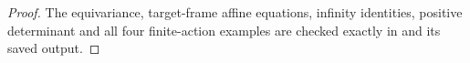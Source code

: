 \begin{proof}
The equivariance, target-frame affine equations,
infinity identities, positive determinant and
all four finite-action examples are checked
exactly in 
and its saved output.
\end{proof}
